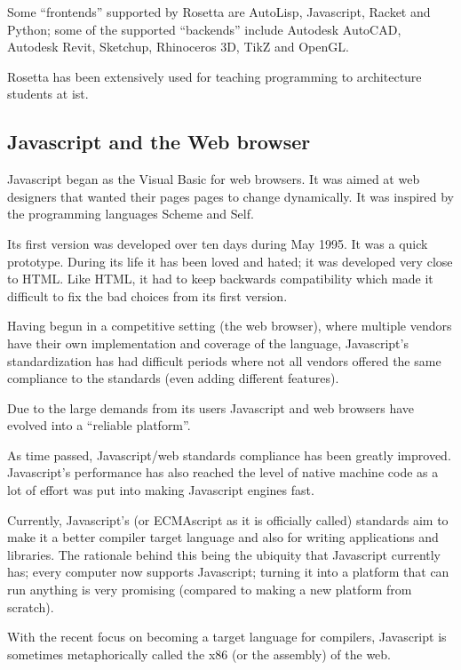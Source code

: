 \documentclass{./llncs2e/llncs}
\begin{document}
	Some ``frontends'' supported by Rosetta are AutoLisp, Javascript, Racket and Python; some of the supported ``backends'' include Autodesk AutoCAD, Autodesk Revit, Sketchup, Rhinoceros 3D, TikZ and OpenGL.

	Rosetta has been extensively used for teaching programming to architecture students at \ac{ist}. 


\subsection{Javascript and the Web browser}
	Javascript began as the Visual Basic for web browsers. It was aimed at web designers that wanted their pages pages to change dynamically. It was inspired by the programming languages Scheme and Self.

	Its first version was developed over ten days during May 1995. It was a quick prototype. 
	During its life it has been loved and hated; it was developed very close to HTML. Like HTML, it had to keep backwards compatibility which made it difficult to fix the bad choices from its first version.

	Having begun in a competitive setting (the web browser), where multiple vendors have their own implementation and coverage of the language, Javascript's standardization has had difficult periods where not all vendors offered the same compliance to the standards (even adding different features).

	Due to the large demands from its users Javascript and web browsers have evolved into a ``reliable platform''. 

	As time passed, Javascript/web standards compliance has been greatly improved. Javascript's performance has also reached the level of native machine code as a lot of effort was put into making Javascript engines fast.

	Currently, Javascript's (or ECMAscript as it is officially called) standards aim to make it a better compiler target language and also for writing applications and libraries. The rationale behind this being the ubiquity that Javascript currently has; every computer now supports Javascript; turning it into a platform that can run anything is very promising (compared to making a new platform from scratch).

	With the recent focus on becoming a target language for compilers, Javascript is sometimes metaphorically called the x86 (or the assembly) of the web.
\end{document}
